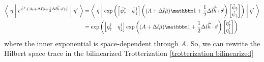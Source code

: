 \begin{align}
	\matrixElement{\eta}{ e^{\tilde{\psi}\adjoint \cdot (A_t + \Delta\tilde{t} \tilde{\mu} + \half \Delta\tilde{t}\tilde{\vec{h}}\cdot\vec{\sigma})\tilde{\psi}} }{\eta'}
	&=
		\matrixElement{\eta}{ \exp\left(
			\begin{bmatrix} \tilde{\psi}^{\dagger}_{\up} &  \tilde{\psi}^{\dagger}_{\down}  \end{bmatrix} 
			\left(
				(A + \Delta\tilde{t}\tilde{\mu})\one + \half \Delta\tilde{t}\tilde{\vec{h}}\cdot\vec{\sigma}
			\right)
			\begin{bmatrix} \tilde{\psi}_{\up} \\  \tilde{\psi}_{\down}  \end{bmatrix}
		\right) }{\eta'}
	\label{eq:gaussian spinors}\\
	& = 
		\exp\left(
			\begin{bmatrix} \eta^{\dagger}_{\up} &  \eta^{\dagger}_{\down}  \end{bmatrix} 
			\exp\left(
				(A + \Delta\tilde{t}\tilde{\mu})\one + \half \Delta\tilde{t}\tilde{\vec{h}}\cdot\vec{\sigma}
			\right)
			\begin{bmatrix} \eta'_{\up} \\  \eta'_{\down}  \end{bmatrix}
		\right)
\end{align}
where the inner exponential is space-dependent through $A$.
So, we can rewrite the Hilbert space trace in the bilinearized Trotterization \eqref{trotterization bilinearized}
